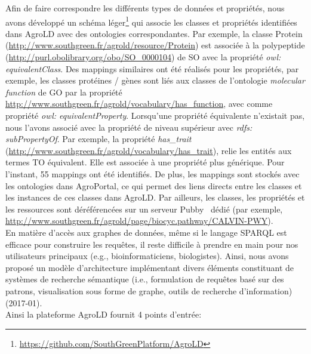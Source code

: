 Afin de faire correspondre les différents types de données et propriétés, nous avons développé un schéma léger\footnote{\url{https://github.com/SouthGreenPlatform/AgroLD}} qui associe les classes et propriétés identifiées dans AgroLD avec des ontologies correspondantes. Par exemple, la classe Protein (\url{http://www.southgreen.fr/agrold/resource/Protein}) est associée à la polypeptide (\url{http://purl.obolibrary.org/obo/SO\_0000104}) de SO avec la propriété \textit{owl: equivalentClass}. Des mappings similaires ont été réalisés pour les propriétés, par exemple, les classes protéines / gènes sont liés aux classes de l'ontologie \textit{molecular function} de GO par la propriété \url{http://www.southgreen.fr/agrold/vocabulary/has\_function}, avec comme propriété \textit{owl: equivalentProperty}. Lorsqu'une propriété équivalente n'existait pas, nous l'avons associé avec la propriété de niveau supérieur avec \textit{rdfs: subPropertyOf}. Par exemple, la propriété \textit{has\_trait} (\url{http://www.southgreen.fr/agrold/vocabulary/has\_trait}), relie les entités aux termes TO équivalent. Elle est associée à une propriété plus générique. Pour l'instant, 55 mappings ont été identifiés. De plus, les mappings sont stockés avec les ontologies dans AgroPortal, ce qui permet des liens directs entre les classes et les instances de ces classes dans AgroLD. Par ailleurs, les classes, les propriétés et les ressources sont déréférencées sur un serveur Pubby~\cite{pubby} dédié (par exemple, \url{http://www.southgreen.fr/agrold/page/biocyc.pathway/CALVIN-PWY}).\\


En matière d’accès aux graphes de données, même si le langage SPARQL est efficace pour construire les requêtes, il reste difficile à prendre en main pour nos utilisateurs principaux (e.g., bioinformaticiens, biologistes). Ainsi, nous avons proposé un modèle d'architecture implémentant divers éléments constituant de systèmes de recherche sémantique (i.e., formulation de requêtes basé sur des patrons, visualisation sous forme de graphe, outils de recherche d’information) (2017-01).\\
Ainsi la plateforme AgroLD fournit 4 points d'entrée:\\

